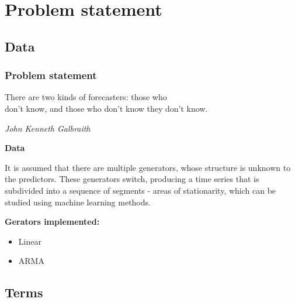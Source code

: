 \documentclass{beamer}
\begin{document}
\section{Problem statement} 
\subsection{Data} 

\begin{frame}
\frametitle{Problem statement}

\epigraph{There are two kinds of forecasters: those who \\ don’t know, and those who don’t know they don’t know.}{\textit{John Kenneth Galbraith}}

\textbf{Data}

It is assumed that there are multiple generators, whose structure is unknown to the predictors. These generators switch, producing a time series that is subdivided into a sequence of segments - areas of stationarity, which can be studied using machine learning methods. 

\bigskip
\textbf{Gerators implemented:}
\begin{itemize}
\item Linear 
\item ARMA
\end{itemize}




\end{frame}


\subsection{Terms} 
\end{document}
